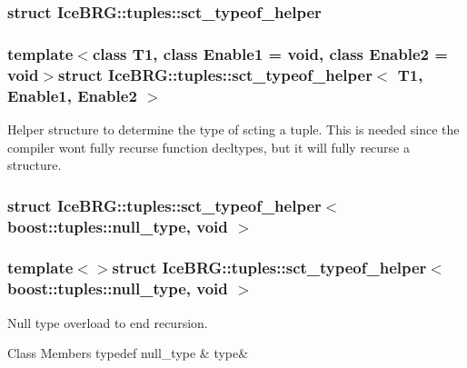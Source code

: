\subsubsection{struct Ice\+B\+R\+G\+:\+:tuples\+:\+:sct\+\_\+typeof\+\_\+helper}
\subsubsection*{template$<$class T1, class Enable1 = void, class Enable2 = void$>$struct Ice\+B\+R\+G\+::tuples\+::sct\+\_\+typeof\+\_\+helper$<$ T1, Enable1, Enable2 $>$}

Helper structure to determine the type of scting a tuple. This is needed since the compiler won\textquotesingle{}t fully recurse function decltypes, but it will fully recurse a structure. \label{structIceBRG_1_1tuples_1_1sct__typeof__helper_3_01boost_1_1tuples_1_1null__type_00_01void_01_4}
\hypertarget{namespaceIceBRG_1_1tuples_structIceBRG_1_1tuples_1_1sct__typeof__helper_3_01boost_1_1tuples_1_1null__type_00_01void_01_4}{}
\subsubsection{struct Ice\+B\+R\+G\+:\+:tuples\+:\+:sct\+\_\+typeof\+\_\+helper$<$ boost\+:\+:tuples\+:\+:null\+\_\+type, void $>$}
\subsubsection*{template$<$$>$struct Ice\+B\+R\+G\+::tuples\+::sct\+\_\+typeof\+\_\+helper$<$ boost\+::tuples\+::null\+\_\+type, void $>$}

Null type overload to end recursion. \begin{DoxyFields}{Class Members}
\hypertarget{namespaceIceBRG_1_1tuples_a5bdafd92e206713e6c9c567192e3be0b}{}typedef null\+\_\+type\label{namespaceIceBRG_1_1tuples_a5bdafd92e206713e6c9c567192e3be0b}
&
type&
\\
\hline

\end{DoxyFields}
\label{structIceBRG_1_1tuples_1_1sct__typeof__helper_3_01T1_00_01BRG__S__IS__TUPLE_07T1_08_4}
\hypertarget{namespaceIceBRG_1_1tuples_structIceBRG_1_1tuples_1_1sct__typeof__helper_3_01T1_00_01BRG__S__IS__TUPLE_07T1_08_4}{}
